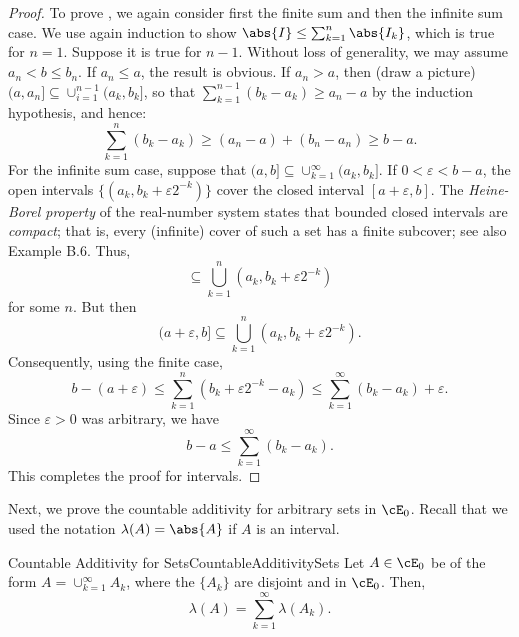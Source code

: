 \begin{proof}
	To prove , we again consider first the finite sum and then the infinite sum case. We use again induction to show $\abs{I} \le \sum_{k=1}^n \abs{I_k}$, which is true for $n=1$. Suppose it is true for $n-1$. Without loss of generality, we may assume $a_n < b \le b_n$. If $a_n \le a$, the result is obvious. If $a_n > a$, then (draw a picture) $(a, a_n] \subseteq \cup_{i=1}^{n-1} (a_k, b_k]$, so that $\sum_{k=1}^{n-1} (b_k - a_k) \ge a_n - a$ by the induction hypothesis, and hence:
	\begin{equation*}
		\sum_{k=1}^n (b_k - a_k) \ge (a_n - a) + (b_n - a_n) \ge b - a.
	\end{equation*}
	For the infinite sum case, suppose that $(a, b] \subseteq \cup_{k=1}^\infty (a_k, b_k]$. If $0 < \varepsilon < b - a$, the open intervals $\{(a_k, b_k + \varepsilon 2^{-k})\}$ cover the closed interval $[a + \varepsilon, b]$. The \textit{Heine-Borel property} of the real-number system states that bounded closed intervals are \textit{compact}; that is, every (infinite) cover of such a set has a finite subcover; see also Example B.6. Thus,
	\begin{equation*}
		[a + \varepsilon, b] \subseteq \bigcup_{k=1}^n (a_k, b_k + \varepsilon 2^{-k})
	\end{equation*}
	for some $n$. But then
	\begin{equation*}
		(a + \varepsilon, b] \subseteq \bigcup_{k=1}^n (a_k, b_k + \varepsilon 2^{-k}).
	\end{equation*}
	Consequently, using the finite case,
	\begin{equation*}
		b - (a + \varepsilon) \le \sum_{k=1}^n (b_k + \varepsilon 2^{-k} - a_k) \le \sum_{k=1}^\infty (b_k - a_k) + \varepsilon.
	\end{equation*}
	Since $\varepsilon > 0$ was arbitrary, we have
	\begin{equation*}
		b - a \le \sum_{k=1}^\infty (b_k - a_k).
	\end{equation*}
	This completes the proof for intervals.
\end{proof}

Next, we prove the countable additivity for arbitrary sets in $\cE_0$. Recall that we used the notation $\lambda(A) = \abs{A}$ if $A$ is an interval.

\begin{thm}{Countable Additivity for Sets}{CountableAdditivitySets}
	Let $A \in \cE_0$ be of the form $A = \cup_{k=1}^\infty A_k$, where the $\{A_k\}$ are disjoint and in $\cE_0$. Then,
	\begin{equation*}
		\lambda(A) = \sum_{k=1}^\infty \lambda(A_k).
	\end{equation*}
\end{thm}

